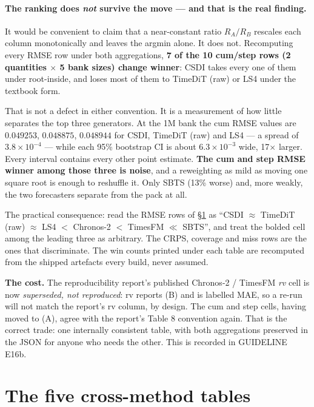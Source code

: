 \documentclass[11pt,a4paper]{article}
\begin{document}
\paragraph{The ranking does \emph{not} survive the move --- and that is the real
finding.} It would be convenient to claim that a near-constant ratio $R_A/R_B$
rescales each column monotonically and leaves the argmin alone. It does not.
Recomputing every RMSE row under both aggregations, \textbf{7 of the 10 cum/step rows
(2 quantities $\times$ 5 bank sizes) change winner}: CSDI takes every one of them
under root-inside, and loses most of them to TimeDiT (raw) or LS4 under the
textbook form.

That is not a defect in either convention. It is a measurement of how little
separates the top three generators. At the 1M bank the cum RMSE values are $0.049253$, $0.048875$, $0.048944$ for CSDI, TimeDiT (raw)
and LS4 --- a spread of $3.8\times10^{-4}$ --- while each 95\% bootstrap CI
is about $6.3\times10^{-3}$ wide, 17$\times$ larger.
Every interval contains every other point estimate. \textbf{The cum and step RMSE
winner among those three is noise}, and a reweighting as mild as moving one
square root is enough to reshuffle it. Only SBTS (13\% worse) and, more weakly, the two forecasters separate from the
pack at all.

The practical consequence: read the RMSE rows of \S\ref{sec:tables} as
``CSDI $\approx$ TimeDiT (raw) $\approx$ LS4 $<$ Chronos-2 $<$ TimesFM $\ll$
SBTS'', and treat the bolded cell among the leading three as arbitrary. The
CRPS, coverage and miss rows are the ones that discriminate. The win counts
printed under each table are recomputed from the shipped artefacts every build,
never assumed.

\textbf{The cost.} The reproducibility report's published Chronos-2 / TimesFM
\emph{rv} cell is now \emph{superseded, not reproduced}: rv reports (B) and is
labelled MAE, so a re-run will not match the report's rv column, by design. The
cum and step cells, having moved to (A), agree with the report's Table 8
convention again. That is the correct trade: one internally consistent table,
with both aggregations preserved in the JSON for anyone who needs the other.
This is recorded in GUIDELINE E16b.

\clearpage
\section{The five cross-method tables}
\label{sec:tables}
\end{document}
